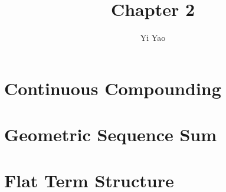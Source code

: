\documentclass{article}
\title{Chapter 2}
\author{Yi Yao}
\begin{document}
    \maketitle
    \section{Continuous Compounding}
    
    \section{Geometric Sequence Sum}
    
    \section{Flat Term Structure}
    
\end{document}
